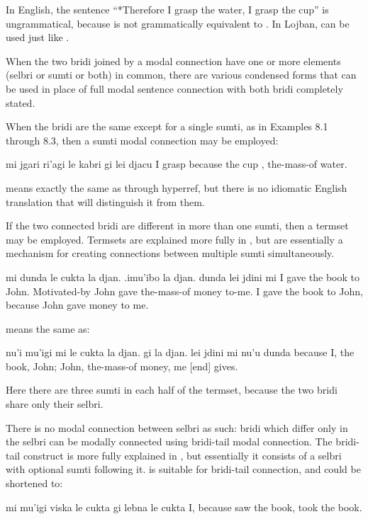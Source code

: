 In English, the sentence ``*Therefore I grasp the water, I
    grasp the cup'' is ungrammatical, because  is not
    grammatically equivalent to . In Lojban,
     can be used just like .

When the two bridi joined by a modal connection have one or
    more elements (selbri or sumti or both) in common, there are
    various condensed forms that can be used in place of full modal
    sentence connection with both bridi completely stated.

When the bridi are the same except for a single sumti, as in
    Examples 8.1 through 8.3, then a sumti modal connection may be
    employed:
\begin{example}
mi jgari ri'agi le kabri gi lei djacu\n
I grasp because the cup , the-mass-of water.
\end{example}

 means exactly the same as  through hyperref, but there is no idiomatic English
    translation that will distinguish it from them. 

If the two connected bridi are different in more than one
    sumti, then a termset may be employed. Termsets are explained
    more fully in , but are
    essentially a mechanism for creating connections between
    multiple sumti simultaneously.
\begin{example}
mi dunda le cukta la djan.\n
\T	.imu'ibo la djan. dunda lei jdini mi\n
I gave the book to John.\n
\T	Motivated-by John gave the-mass-of money to-me.\n
I gave the book to John, because John gave money to me.
\end{example}

{\noindent}means the same as:
\begin{example}
nu'i mu'igi mi le cukta la djan.\n
\T	gi la djan. lei jdini mi nu'u dunda\n
{} because I, the book, John;\n
\T	John, the-mass-of money, me [end] gives.
\end{example}

Here there are three sumti in each half of the termset,
    because the two bridi share only their selbri.

There is no modal connection between selbri as such: bridi
    which differ only in the selbri can be modally connected using
    bridi-tail modal connection. The bridi-tail construct is more
    fully explained in , but
    essentially it consists of a selbri with optional sumti
    following it.  is suitable for
    bridi-tail connection, and could be shortened to:
\begin{example}
mi mu'igi viska le cukta gi lebna le cukta\n
I, because saw the book, took the book.
\end{example}

